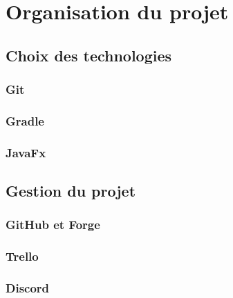 \chapter{Organisation du projet}

	\section{Choix des technologies}

		\subsection{Git}


		\subsection{Gradle}



		\subsection{JavaFx}



	\section{Gestion du projet}


		\subsection{GitHub et Forge}



		\subsection{Trello}



		\subsection{Discord}
